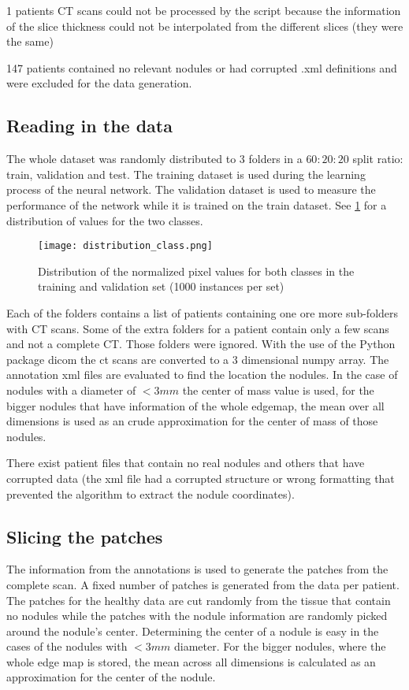 \documentclass[../Thesis.tex]{subfiles}
\begin{document}
1 patients CT scans could not be processed by the script because the information of the slice thickness could not be interpolated from the different slices (they were the same)

147 patients contained no relevant nodules or had corrupted .xml definitions and were excluded for the data generation.

\subsection{Reading in the data}
The whole dataset was randomly distributed to 3 folders in a $60:20:20$ split ratio: train, validation and test. The training dataset is used during the learning process of the neural network. The validation dataset is used to measure the performance of the network while it is trained on the train dataset. See \ref{fig:ttdist} for a distribution of values for the two classes. 
\begin{figure}
\texttt{[image: distribution\_class.png]}
\caption{Distribution of the normalized pixel values for both classes in the training and validation set (1000 instances per set)}
\label{fig:ttdist}
\end{figure}
Each of the folders contains a list of patients containing one ore more sub-folders with CT scans. Some of the extra folders for a patient contain only a few scans and not a complete CT. Those folders were ignored. With the use of the Python package dicom \cite{mason2011t} the ct scans are converted to a 3 dimensional numpy array. The annotation xml files are evaluated to find the location the nodules. In the case of nodules with a diameter of $<3mm$ the center of mass value is used, for the bigger nodules that have information of the whole edgemap, the mean over all dimensions is used as an crude approximation for the center of mass of those nodules. 

There exist patient files that contain no real nodules and others that have corrupted data (the xml file had a corrupted structure or wrong formatting that prevented the algorithm to extract the nodule coordinates).

\subsection{Slicing the patches}
The information from the annotations is used to generate the patches from the complete scan. A fixed number of patches is generated from the data per patient. The patches for the healthy data are cut randomly from the tissue that contain no nodules while the patches with the nodule information are randomly picked around the nodule's center. Determining the center of a nodule is easy in the cases of the nodules with $<3mm$ diameter. For the bigger nodules, where the whole edge map is stored, the mean across all dimensions is calculated as an approximation for the center of the nodule.
\end{document}
